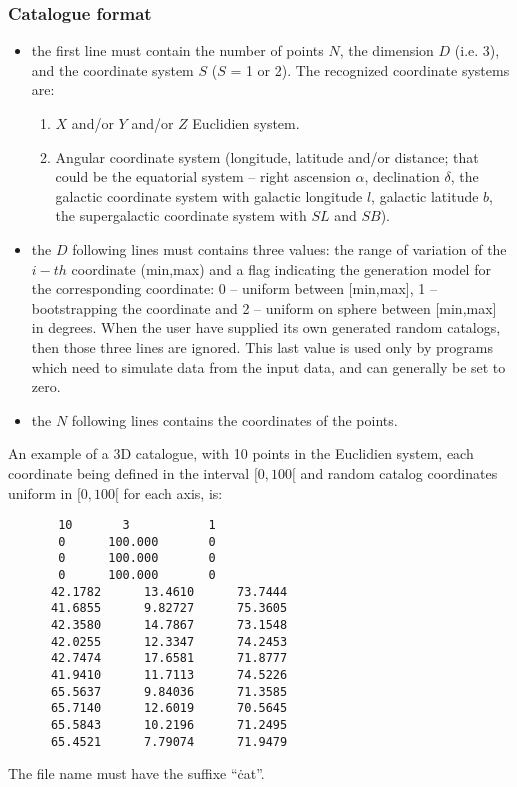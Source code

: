 \subsubsection*{Catalogue format}
\begin{itemize}
\item the first line must contain the number of points $N$, the
  dimension $D$ (i.e. 3), and the coordinate system $S$ ($S$ = 1 or
  2).  The recognized coordinate systems are:
  \begin{enumerate}
  \item $X$ and/or $Y$ and/or $Z$ Euclidien system.
  \item Angular coordinate system (longitude, latitude and/or
    distance; that could be the equatorial system -- right ascension
    $\alpha$, declination $\delta$, the galactic coordinate system
    with galactic longitude $l$, galactic latitude $b$, the
    supergalactic coordinate system with $SL$ and $SB$).
  \end{enumerate}
\item the $D$ following lines must contains three values: the range of
  variation of the $i-th$ coordinate (min,max) and a flag indicating
  the generation model for the corresponding coordinate: 0 -- uniform
  between [min,max], 1 -- bootstrapping the coordinate and 2 -- uniform
  on sphere between [min,max] in degrees. When the user have supplied
  its own generated random catalogs, then those three lines are
  ignored. This last value is used only by programs which need to 
  simulate data from the input data, and can generally be set to zero.
\item the $N$ following lines contains the coordinates of the points.
\end{itemize}
An example of a 3D catalogue, with 10 points in the Euclidien system,
each coordinate being defined in the interval $[0,100[$ and random
catalog coordinates uniform in $[0,100[$ for each axis, is:
\begin{verbatim}
       10       3           1
       0      100.000       0
       0      100.000       0
       0      100.000       0
      42.1782      13.4610      73.7444
      41.6855      9.82727      75.3605
      42.3580      14.7867      73.1548
      42.0255      12.3347      74.2453
      42.7474      17.6581      71.8777
      41.9410      11.7113      74.5226
      65.5637      9.84036      71.3585
      65.7140      12.6019      70.5645
      65.5843      10.2196      71.2495
      65.4521      7.79074      71.9479
\end{verbatim}
The file name must have the suffixe ``\.cat''.

